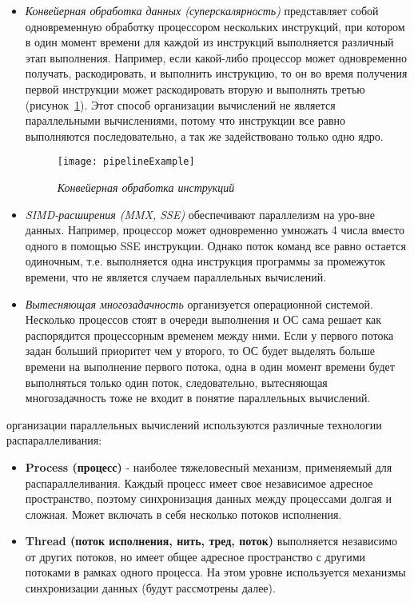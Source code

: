 {\begin{itemize}
			\item\textit{Конвейерная обработка данных (суперскалярность)} представляет собой одновременную обработку процессором нескольких инструкций, при котором в один момент времени для каждой из инструкций выполняется различный этап выполнения. Например, если какой-либо процессор может одновременно получать, раскодировать, и выполнить инструкцию, то он во время получения первой инструкции может раскодировать вторую и выполнять третью (рисунок~\ref{pipelineExample:image}). Этот способ организации вычислений не является параллельными вычислениями, потому что инструкции все равно выполняются последовательно, а так же задействовано только одно ядро.
				\begin{figure}[H]
					\texttt{[image: pipelineExample]}
					\caption{\textit{Конвейерная обработка инструкций}}
					\label{pipelineExample:image}
				\end{figure}
			\item\textit{SIMD-расширения (MMX, SSE)} обеспечивают параллелизм на уро-вне данных. Например, процессор может одновременно умножать 4 числа вместо одного в помощью SSE инструкции. Однако поток команд все равно остается одиночным, т.е. выполняется одна инструкция программы за промежуток времени, что не является случаем параллельных вычислений.
			\item\textit{Вытесняющая многозадачность} организуется операционной системой. Несколько процессов стоят в очереди выполнения и ОС сама решает как распорядится процессорным временем между ними. Если у первого потока задан больший приоритет чем у второго, то ОС будет выделять больше времени на выполнение первого потока, одна в один момент времени будет выполняться только один поток, следовательно, вытесняющая многозадачность тоже не входит в понятие параллельных вычислений.
		\end{itemize}
	 организации параллельных вычислений используются различные технологии распараллеливания:
		\begin{itemize}
			\item\textbf{Process (процесс)} - наиболее тяжеловесный механизм, применяемый для распараллеливания. Каждый процесс имеет свое независимое адресное пространство, поэтому синхронизация данных между процессами долгая и сложная. Может включать в себя несколько потоков исполнения.
			\item\textbf{Thread (поток исполнения, нить, тред, поток)} выполняется независимо от других потоков, но имеет общее адресное пространство с другими потоками в рамках одного процесса. На этом уровне используется механизмы синхронизации данных (будут рассмотрены далее).

\end{itemize}}
